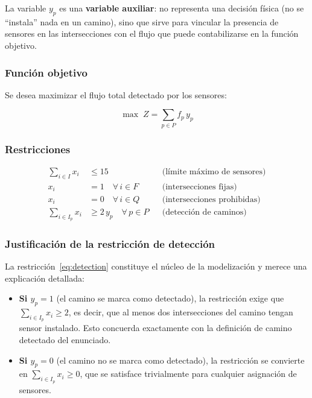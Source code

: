 \documentclass[12pt,a4paper]{article}
\begin{document}
La variable $y_p$ es una \textbf{variable auxiliar}: no representa una decisión física (no se ``instala'' nada en un camino), sino que sirve para vincular la presencia de sensores en las intersecciones con el flujo que puede contabilizarse en la función objetivo.

\subsubsection{Función objetivo}

Se desea maximizar el flujo total detectado por los sensores:

\[
\max\; Z = \sum_{p \in P} f_p \, y_p
\]

\subsubsection{Restricciones}

\begin{align}
\sum_{i \in I} x_i &\leq 15 && \text{(límite máximo de sensores)} \label{eq:limit} \\[4pt]
x_i &= 1 \quad \forall\, i \in F && \text{(intersecciones fijas)} \label{eq:fixed} \\[4pt]
x_i &= 0 \quad \forall\, i \in Q && \text{(intersecciones prohibidas)} \label{eq:prohibited} \\[4pt]
\sum_{i \in I_p} x_i &\geq 2\,y_p \quad \forall\, p \in P && \text{(detección de caminos)} \label{eq:detection}
\end{align}

\subsubsection{Justificación de la restricción de detección}

La restricción~\eqref{eq:detection} constituye el núcleo de la modelización y merece una explicación detallada:

\begin{itemize}
    \item \textbf{Si $y_p = 1$} (el camino se marca como detectado), la restricción exige que $\sum_{i \in I_p} x_i \geq 2$, es decir, que al menos dos intersecciones del camino tengan sensor instalado. Esto concuerda exactamente con la definición de camino detectado del enunciado.
    \item \textbf{Si $y_p = 0$} (el camino no se marca como detectado), la restricción se convierte en $\sum_{i \in I_p} x_i \geq 0$, que se satisface trivialmente para cualquier asignación de sensores.
\end{itemize}
\end{document}
